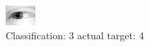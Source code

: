 \begin{figure}[h!]
\begin{center}
\includegraphics[width=0.60\columnwidth]{figures/ID2506_class_3_target_4.png}
\end{center}
\caption{ Classification: 3 actual target: 4}
\label{fig:ID2506_class_3_target_4}
\end{figure}
